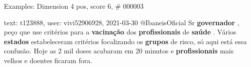 \begin{frame}{Examples: Dimension 4 pos, score 6, \# 000003}
\footnotesize
\begin{exampleblock}{text: t123888, user: vivi52906928, 2021-03-30}
@IbaneisOficial Sr \textbf{governador} , peço que use critérios para a 
\textbf{vacinação} dos \textbf{profissionais} de \textbf{saúde} . Vários 
\textbf{estados} estabeleceram critérios focalizando os \textbf{grupos} de 
risco, só aqui está essa confusão. Hoje as 2 mil doses acabaram em 20 minutos e 
\textbf{profissionais} mais velhos e doentes ficaram fora. 
\end{exampleblock}
\end{frame}
